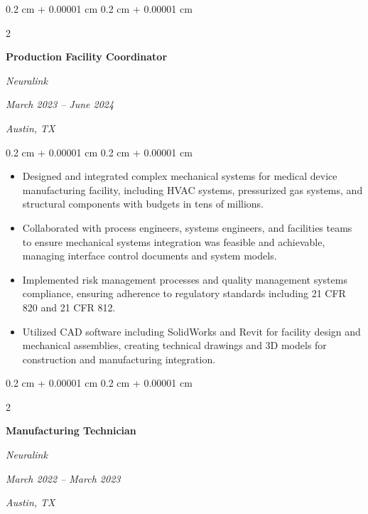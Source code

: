 \documentclass[10pt, letterpaper]{article}
\newenvironment{highlights}{
    \begin{itemize}[
        topsep=0.10 cm,
        parsep=0.10 cm,
        partopsep=0pt,
        itemsep=0pt,
        leftmargin=0.4 cm + 10pt
    ]
}{
    \end{itemize}
} %
\newenvironment{onecolentry}{
    \begin{adjustwidth}{
        0.2 cm + 0.00001 cm
    }{
        0.2 cm + 0.00001 cm
    }
}{
    \end{adjustwidth}
} %
\newenvironment{twocolentry}[2][]{
    \onecolentry
    \def\secondColumn{#2}
    \setcolumnwidth{\fill, 9.0 cm}
    \begin{paracol}{2}
}{
    \switchcolumn \raggedleft \secondColumn
    \end{paracol}
    \endonecolentry
} %
\begin{document}
        \vspace{0.35 cm}

        \begin{twocolentry}{
            \textit{March 2023 – June 2024}
            
            \textit{Austin, TX}}
            \textbf{Production Facility Coordinator}
            
            \textit{Neuralink}
        \end{twocolentry}

        \vspace{0.10 cm}
        \begin{onecolentry}
            \begin{highlights}
                \item Designed and integrated complex mechanical systems for medical device manufacturing facility, including HVAC systems, pressurized gas systems, and structural components with budgets in tens of millions.
                \item Collaborated with process engineers, systems engineers, and facilities teams to ensure mechanical systems integration was feasible and achievable, managing interface control documents and system models.
                \item Implemented risk management processes and quality management systems compliance, ensuring adherence to regulatory standards including 21 CFR 820 and 21 CFR 812.
                \item Utilized CAD software including SolidWorks and Revit for facility design and mechanical assemblies, creating technical drawings and 3D models for construction and manufacturing integration.
            \end{highlights}
        \end{onecolentry}

        \vspace{0.35 cm}

        \begin{twocolentry}{
            \textit{March 2022 – March 2023}
            
            \textit{Austin, TX}}
            \textbf{Manufacturing Technician}
            
            \textit{Neuralink}
        \end{twocolentry}
\end{document}
